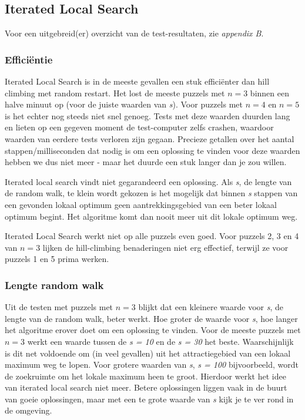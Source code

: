 \documentclass[]{report}
\begin{document}
\subsection{Iterated Local Search}
Voor een uitgebreid(er) overzicht van de test-resultaten, zie \textit{appendix B}.
\subsubsection{Effici\"{e}ntie}
Iterated Local Search is in de meeste gevallen een stuk effici\"{e}nter dan hill climbing met random restart. Het lost de meeste puzzels met $n = 3$ binnen een halve minuut op (voor de juiste waarden van \textit{s}). Voor puzzels met $n = 4$ en $n = 5$ is het echter nog steeds niet snel genoeg. Tests met deze waarden duurden lang en lieten op een gegeven moment de test-computer zelfs crashen, waardoor waarden van eerdere tests verloren zijn gegaan. Precieze getallen over het aantal stappen/milliseconden dat nodig is om een oplossing te vinden voor deze waarden hebben we dus niet meer - maar het duurde een stuk langer dan je zou willen.

Iterated local search vindt niet gegarandeerd een oplossing. Als \textit{s}, de lengte van de random walk, te klein wordt gekozen is het mogelijk dat binnen \textit{s} stappen van een gevonden lokaal optimum geen aantrekkingsgebied van een beter lokaal optimum begint. Het algoritme komt dan nooit meer uit dit lokale optimum weg. 

Iterated Local Search werkt niet op alle puzzels even goed. Voor puzzels 2, 3 en 4 van $n = 3$ lijken de hill-climbing benaderingen niet erg effectief, terwijl ze voor puzzels 1 en 5 prima werken.


\subsubsection{Lengte random walk}
Uit de testen met puzzels met $n = 3$ blijkt dat een kleinere waarde voor \textit{s}, de lengte van de random walk, beter werkt. Hoe groter de waarde voor \textit{s}, hoe langer het algoritme erover doet om een oplossing te vinden. Voor de meeste puzzels met $n = 3$ werkt een waarde tussen de \textit{s = 10} en de \textit{s = 30} het beste. Waarschijnlijk is dit net voldoende om (in veel gevallen) uit het attractiegebied van een lokaal maximum weg te lopen. Voor grotere waarden van \textit{s}, \textit{s = 100} bijvoorbeeld, wordt de zoekruimte om het lokale maximum heen te groot. Hierdoor werkt het idee van iterated local search niet meer. Betere oplossingen liggen vaak in de buurt van goeie oplossingen, maar met een te grote waarde van \textit{s} kijk je te ver rond in de omgeving. 
\end{document}
